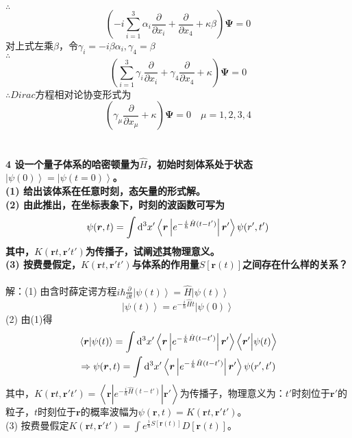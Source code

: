 \documentclass[12pt]{article}
\numberwithin{equation}{section}	 %
\begin{document}
\begin{spacing}{1.5}
$\therefore$
\begin{equation}
\left( -i\sum_{i=1}^{3}\alpha_{i}\frac{\partial}{\partial x_{i}} + \frac{\partial}{\partial x_{4}} + \kappa\beta \right) \bm\Psi = 0
\end{equation}
对上式左乘$\beta$，令$\gamma_{i}=-i\beta\alpha_{i},\gamma_{4}=\beta$\\
$\therefore$
\begin{equation}
\left( \sum_{i=1}^{3}\gamma_{i}\frac{\partial}{\partial x_{i}} + \gamma_{4}\frac{\partial}{\partial x_{4}} + \kappa \right) \bm\Psi = 0
\end{equation}
$\therefore  Dirac$方程相对论协变形式为
\begin{equation}
\left( \gamma_{\mu}\frac{\partial}{\partial x_{\mu}} + \kappa \right) \bm\Psi = 0 \quad \mu=1,2,3,4
\end{equation}
~\\
~\\
\textbf{4 \quad 设一个量子体系的哈密顿量为$\hat{H}$，初始时刻体系处于状态$\displaystyle \left|\psi(0)\right> = \left|\psi(t=0)\right>$。\\
(1) 给出该体系在任意时刻，态矢量的形式解。\\
(2) 由此推出，在坐标表象下，时刻的波函数可写为
\begin{equation}\nonumber 		%
\psi(\bm{r},t) = \int\dif^{3}x'\left<\bm{r}\left|e^{-\frac{i}{\hbar}\hat{H}(t-t')}\right|\bm{r}'\right> \psi(r',t')
\end{equation}
其中，$\displaystyle K(\bm{r}t,\bm{r}'t')$为传播子，试阐述其物理意义。\\
(3) 按费曼假定，$\displaystyle K(\bm{r}t,\bm{r}'t')$与体系的作用量$S[\bm{r}(t)]$之间存在什么样的关系？}
~\\
解：(1) 由含时薛定谔方程$\displaystyle i\hbar\frac{\partial }{\partial t} \left|\psi(t)\right> = \hat{H} \left|\psi(t)\right>$
\begin{equation}\nonumber 		%
\left|\psi(t)\right> = e^{-\frac{i}{\hbar}\hat{H}t}\left|\psi(0)\right>
\end{equation}
(2) 由(1)得
\begin{align*}
&\left<\bm{r}|\psi(t)\right> = \int\mathop{}\!\mathrm{d}^{3}x'\left<\bm{r}\left|e^{-\frac{i}{\hbar}\hat{H}(t-t')}\right|\bm{r}'\right> \left<\bm{r}'\Big|\psi(t)\right> \\
&\Rightarrow \psi(\bm{r},t) = \int\mathop{}\!\mathrm{d}^{3}x'\left<\bm{r}\left|e^{-\frac{i}{\hbar}\hat{H}(t-t')}\right|\bm{r}'\right> \psi(r',t')
\end{align*}
其中，$\displaystyle K(\bm{r}t,\bm{r}'t')=\left<\bm{r}\left|e^{-\frac{i}{\hbar}\hat{H}(t-t')}\right|\bm{r}'\right>$为传播子，物理意义为：$t'$时刻位于$\bm{r}'$的粒子，$t$时刻位于$\bm{r}$的概率波幅为$\psi(\bm{r},t) = K(\bm{r}t,\bm{r}'t')$。\\
(3) 按费曼假定$\displaystyle K(\bm{r}t,\bm{r}'t') = \int e^{\frac{i}{\hbar}S[\bm{r}(t)]}D[\bm{r}(t)]$。\\
~\\
~\\



\end{spacing}
\end{document}
